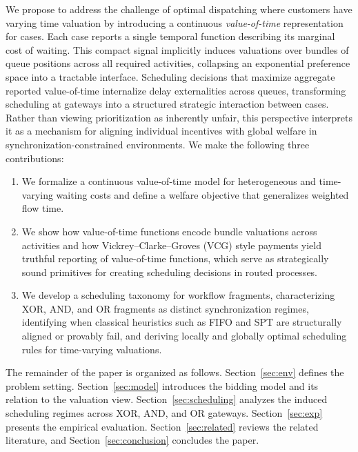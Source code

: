 \documentclass[letterpaper]{article}
\begin{document}
We propose to address the challenge of optimal dispatching where customers have varying time valuation by introducing a continuous \emph{value-of-time}
representation for cases.  
Each case reports a single temporal function describing
its marginal cost of waiting. This compact signal implicitly induces valuations over bundles of queue positions across all required activities, collapsing an exponential preference space into a tractable interface. Scheduling decisions that maximize aggregate reported value-of-time internalize delay externalities across queues, transforming scheduling at gateways into a structured strategic interaction between cases. Rather than viewing prioritization as inherently unfair, this perspective
interprets it as a mechanism for aligning individual incentives with global welfare in synchronization-constrained environments. We make the following three contributions:
\begin{enumerate}[label=(\arabic*),noitemsep,topsep=0pt,leftmargin=*]
\item We formalize a continuous value-of-time model for heterogeneous and time-varying waiting costs and define a welfare objective that generalizes weighted flow time.
\item We show how value-of-time functions encode bundle valuations across activities and how Vickrey--Clarke--Groves (VCG) style payments yield truthful reporting of value-of-time functions,
which serve as strategically sound primitives for creating
scheduling decisions in routed processes.
\item We develop a scheduling taxonomy for workflow fragments, characterizing XOR, AND, and OR fragments as distinct synchronization regimes, identifying when classical heuristics such as FIFO and SPT are structurally aligned or provably fail, and deriving locally and globally optimal scheduling rules for time-varying valuations.
\end{enumerate} The remainder of the paper is organized as follows. Section~\ref{sec:env} defines the problem setting. Section~\ref{sec:model} introduces the bidding model and its relation to the valuation view. Section~\ref{sec:scheduling} analyzes the induced scheduling regimes across XOR, AND, and OR gateways. Section~\ref{sec:exp} presents the empirical evaluation. Section~\ref{sec:related} reviews the related literature, and Section~\ref{sec:conclusion} concludes the paper.


\end{document}
